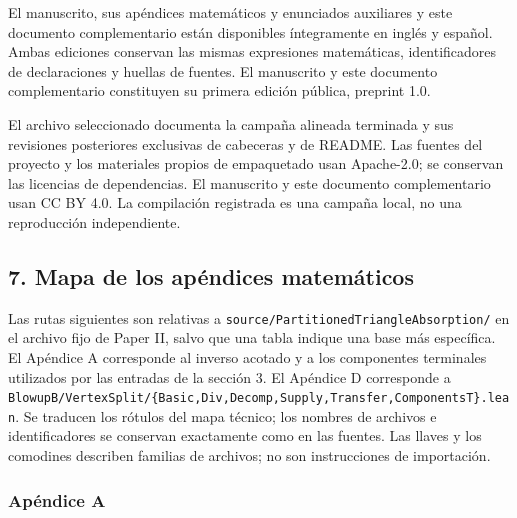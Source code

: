 \documentclass[spanish,11pt,a4paper]{article}
\begin{document}
El manuscrito, sus apéndices matemáticos y enunciados auxiliares y este documento complementario están disponibles íntegramente en inglés y español. Ambas ediciones conservan las mismas expresiones matemáticas, identificadores de declaraciones y huellas de fuentes. El manuscrito y este documento complementario constituyen su primera edición pública, preprint 1.0.

El archivo seleccionado documenta la campaña alineada terminada y sus revisiones posteriores exclusivas de cabeceras y de README. Las fuentes del proyecto y los materiales propios de empaquetado usan Apache-2.0; se conservan las licencias de dependencias. El manuscrito y este documento complementario usan CC BY 4.0. La compilación registrada es una campaña local, no una reproducción independiente.

\subsection{7. Mapa de los apéndices matemáticos}\label{mapa-de-los-apuxe9ndices-matemuxe1ticos}

Las rutas siguientes son relativas a \texttt{source/\allowbreak{}Parti\allowbreak{}tioned\allowbreak{}Triang\allowbreak{}le\allowbreak{}Absorption\allowbreak{}/\allowbreak{}} en el archivo fijo de Paper II, salvo que una tabla indique una base más específica. El Apéndice A corresponde al inverso acotado y a los componentes terminales utilizados por las entradas de la sección 3. El Apéndice D corresponde a \texttt{Blowup\allowbreak{}B/\allowbreak{}Vert\allowbreak{}ex\allowbreak{}Split/\allowbreak{}\{\allowbreak{}Bas\allowbreak{}ic,\allowbreak{}Div,\allowbreak{}Decom\allowbreak{}p,\allowbreak{}Supply,\allowbreak{}Tra\allowbreak{}nsfer,\allowbreak{}Compon\allowbreak{}ents\allowbreak{}T\}\allowbreak{}.\allowbreak{}lean}. Se traducen los rótulos del mapa técnico; los nombres de archivos e identificadores se conservan exactamente como en las fuentes. Las llaves y los comodines describen familias de archivos; no son instrucciones de importación.

\subsubsection{Apéndice A}\label{apuxe9ndice-a}
\end{document}
